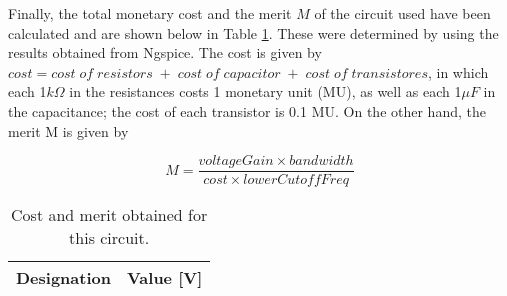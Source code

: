 Finally, the total monetary cost and the merit $M$ of the circuit used have been calculated and are shown below in Table \ref{tab:rip}. These were determined by using the results obtained from Ngspice. The cost is given by $cost=cost\; of\; resistors\; +\; cost\; of\; capacitor\; +\; cost\; of\; transistores$, in which each 1$k\Omega$ in the resistances costs 1 monetary unit (MU), as well as each 1$\mu F$ in the capacitance; the cost of each transistor is 0.1 MU. On the other hand, the  merit M is given by

\begin{equation} \label{eq:merit}
  M=\frac{voltageGain \times bandwidth}{cost\times lowerCutoffFreq} 
\end{equation}


\begin{table}[H]
  \centering
  \begin{tabular}{|c|c|}
    \hline
        {\bf Designation} & {\bf Value [V]} \\ \hline
        
  \end{tabular}
  \caption{Cost and merit obtained for this circuit.} 
  \label{tab:rip}
\end{table}
